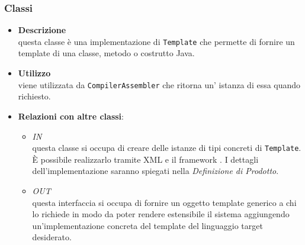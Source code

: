 \subsubsection{Classi}
\label{\nogloxy{swedesigner::server::template::java::JavaTemplate}}
\begin{itemize}
\item \textbf{Descrizione}\\
questa classe è una implementazione di \texttt{Template} che permette di fornire un template di una classe, metodo o costrutto Java.
\item \textbf{Utilizzo}\\
viene utilizzata da \texttt{CompilerAssembler} che ritorna un' istanza di essa quando richiesto.
\item \textbf{Relazioni con altre classi}:
\begin{itemize}
\item \textit{IN} \hyperref[\nogloxy{swedesigner::server::template::TemplateAssembler}]{}\\
questa classe si occupa di creare delle istanze di tipi concreti di \texttt{Template}. È possibile realizzarlo tramite XML e il framework \spring. I dettagli dell'implementazione saranno spiegati nella \emph{Definizione di Prodotto}. %
\item \textit{OUT} \hyperref[\nogloxy{swedesigner::server::template::Template}]{}\\
questa interfaccia si occupa di fornire un oggetto template generico a chi lo richiede in modo da poter rendere estensibile il sistema aggiungendo un'implementazione concreta del template del linguaggio target desiderato.
\end{itemize}
\end{itemize}
\subsection{}
\label{\nogloxy{swedesigner::server::utility}}
